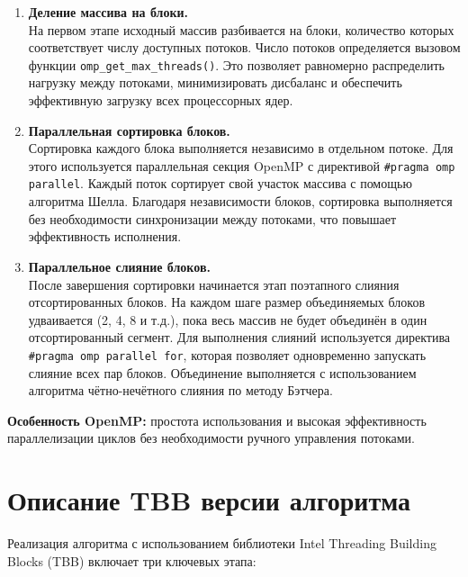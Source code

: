 \documentclass[a4paper,12pt]{article}
\begin{document}
\begin{enumerate}
    \item \textbf{Деление массива на блоки.} \\
    На первом этапе исходный массив разбивается на блоки, количество которых соответствует числу доступных потоков. Число потоков определяется вызовом функции \texttt{omp\_get\_max\_threads()}. Это позволяет равномерно распределить нагрузку между потоками, минимизировать дисбаланс и обеспечить эффективную загрузку всех процессорных ядер.

    \item \textbf{Параллельная сортировка блоков.} \\
    Сортировка каждого блока выполняется независимо в отдельном потоке. Для этого используется параллельная секция OpenMP с директивой \texttt{\#pragma omp parallel}. Каждый поток сортирует свой участок массива с помощью алгоритма Шелла. Благодаря независимости блоков, сортировка выполняется без необходимости синхронизации между потоками, что повышает эффективность исполнения.

    \item \textbf{Параллельное слияние блоков.} \\
    После завершения сортировки начинается этап поэтапного слияния отсортированных блоков. На каждом шаге размер объединяемых блоков удваивается (2, 4, 8 и т.д.), пока весь массив не будет объединён в один отсортированный сегмент. Для выполнения слияний используется директива \texttt{\#pragma omp parallel for}, которая позволяет одновременно запускать слияние всех пар блоков. Объединение выполняется с использованием алгоритма чётно-нечётного слияния по методу Бэтчера.
\end{enumerate}

\textbf{Особенность OpenMP:} простота использования и высокая эффективность параллелизации циклов без необходимости ручного управления потоками.
\newpage

\section{Описание TBB версии алгоритма}
Реализация алгоритма с использованием библиотеки Intel Threading Building Blocks (TBB) включает три ключевых этапа:
\end{document}
